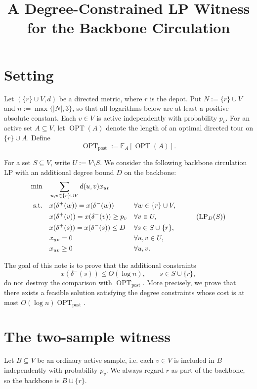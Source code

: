 \documentclass[11pt]{article}
\title{A Degree-Constrained LP Witness for the Backbone Circulation}
\author{}
\date{}
\DeclareMathOperator{\OPT}{OPT}
\newcommand{\E}{\mathbb{E}}
\newcommand{\1}{\mathbf{1}}
\begin{document}
\maketitle

\section{Setting}

Let $(\{r\}\cup V,d)$ be a directed metric, where $r$ is the depot.  Put
$N:=\{r\}\cup V$ and $n:=\max\{|N|,3\}$, so that all logarithms below are
at least a positive absolute constant.  Each
$v\in V$ is active independently with probability $p_v$.  For an active set
$A\subseteq V$, let $\OPT(A)$ denote the length of an optimal directed tour on
$\{r\}\cup A$.  Define
\[
  \OPT_{\mathrm{post}} := \E_A[\OPT(A)].
\]

For a set $S\subseteq V$, write $U:=V\setminus S$.  We consider the following
backbone circulation LP with an additional degree bound $D$ on the backbone:
\[
\begin{aligned}
\min \quad & \sum_{u,v\in \{r\}\cup V} d(u,v)x_{uv} \\
\text{s.t.}\quad
& x(\delta^+(w))=x(\delta^-(w)) && \forall w\in \{r\}\cup V, \\
& x(\delta^+(v))=x(\delta^-(v))\ge p_v && \forall v\in U, \\
& x(\delta^+(s))=x(\delta^-(s))\le D && \forall s\in S\cup\{r\}, \\
& x_{uv}=0 && \forall u,v\in U, \\
& x_{uv}\ge 0 && \forall u,v.
\end{aligned}
\tag{$\mathrm{LP}_D(S)$}
\]

The goal of this note is to prove that the additional constraints
\[
  x(\delta^-(s))\le O(\log n), \qquad s\in S\cup\{r\},
\]
do not destroy the comparison with $\OPT_{\mathrm{post}}$.  More precisely,
we prove that there exists a feasible solution satisfying the degree constraints
whose cost is at most $O(\log n)\OPT_{\mathrm{post}}$.

\section{The two-sample witness}

Let $B\subseteq V$ be an ordinary active sample, i.e. each $v\in V$ is included
in $B$ independently with probability $p_v$.  We always regard $r$ as part of
the backbone, so the backbone is $B\cup\{r\}$.
\end{document}
